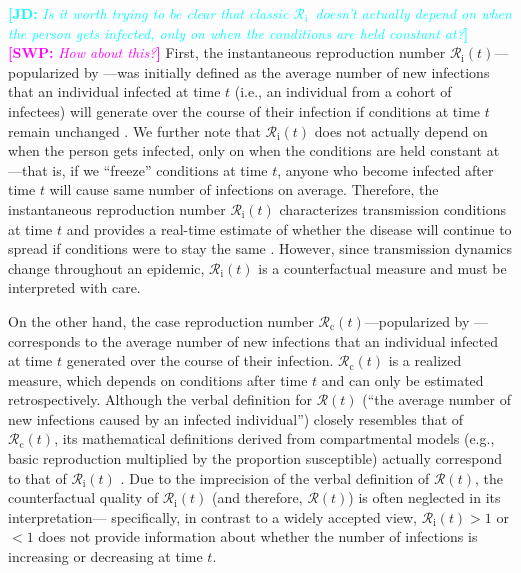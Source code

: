 \documentclass[12pt]{article}
\newcommand{\comment}{\showcomment}
\newcommand{\showcomment}[3]{\textcolor{#1}{\textbf{[#2: }\textsl{#3}\textbf{]}}}
\newcommand{\jd}[1]{\comment{cyan}{JD}{#1}}
\newcommand{\swp}[1]{\comment{magenta}{SWP}{#1}}
\newcommand{\Rx}[1]{\ensuremath{{\mathcal R}_{#1}}\xspace}
\newcommand{\Rc}{\Rx{\mathrm{c}}}
\newcommand{\Ri}{\Rx{\mathrm{i}}}
\newcommand{\RR}{\ensuremath{{\mathcal R}}\xspace}
\begin{document}
\jd{Is it worth trying to be clear that classic \Ri\ doesn't actually depend on when the person gets infected, only on when the conditions are held constant at?} \swp{How about this?}
First, the instantaneous reproduction number $\Ri(t)$---popularized by \cite{cori2013new}---was initially defined as the average number of new infections that an individual infected at time $t$ (i.e., an individual from a cohort of infectees) will generate over the course of their infection if conditions at time $t$ remain unchanged \citep{fraser2007estimating}. 
We further note that $\Ri(t)$ does not actually depend on when the person gets infected, only on when the conditions are held constant at---that is, if we ``freeze'' conditions at time $t$, anyone who become infected after time $t$ will cause same number of infections on average.
Therefore, the instantaneous reproduction number $\Ri(t)$ characterizes transmission conditions at time $t$ and provides a real-time estimate of whether the disease will continue to spread if conditions were to stay the same \citep{gostic2020practical}.
However, since transmission dynamics change throughout an epidemic, $\Ri(t)$ is a counterfactual measure and must be interpreted with care.

On the other hand, the case reproduction number $\Rc(t)$---popularized by \cite{wallinga2004different}---corresponds to the average number of new infections that an individual infected at time $t$ generated over the course of their infection.
$\Rc(t)$ is a realized measure, which depends on conditions after time $t$ and can only be estimated retrospectively.
Although the verbal definition for $\RR(t)$ (``the average number of new infections caused by an infected individual'') closely resembles that of $\Rc(t)$, its mathematical definitions derived from compartmental models (e.g., basic reproduction multiplied by the proportion susceptible) actually correspond to that of $\Ri(t)$ \citep{gostic2020practical}.
Due to the imprecision of the verbal definition of $\RR(t)$, the counterfactual quality of $\Ri(t)$ (and therefore, $\RR(t)$) is often neglected in its interpretation---
specifically, in contrast to a widely accepted view, $\Ri(t) > 1$ or $<1$ does not provide information about whether the number of infections is increasing or decreasing at time $t$.
\end{document}
